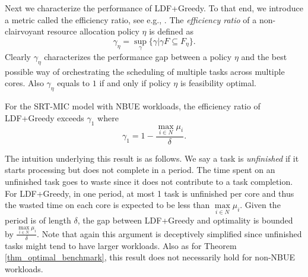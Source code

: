\documentclass[prodmode,acmtompecs]{acmsmall}
\newcommand{\feasibilityRegion}{F}
\newcommand{\fullUserSet}{N}
\newcommand{\myComments}[1]{}
\newif\ifinfocom
\newif\iftompecs
\newif\ifdissertation
\newcommand{\infocomStart}{\ifinfocom \myComments{Infocom: }}
\newcommand{\tompecsStart}{\iftompecs \myComments{TOMPECS version: }}
\newcommand{\dissertationStart}{\ifdissertation  \myComments{Dissertation version: }}
\newcommand{\commentEnd}{\myComments{End}}
\begin{document}
Next we characterize the performance of LDF+Greedy. To that end, we introduce a metric called the efficiency ratio, see e.g., \cite{JLS07A}. The {\em efficiency ratio} of a non-clairvoyant resource allocation policy $\eta$ is defined as 
$$
\gamma_\eta = \sup\limits_{\gamma}\{\gamma | \gamma \feasibilityRegion \subseteq \feasibilityRegion_\eta \}. 
$$
Clearly $\gamma_\eta$ characterizes the performance gap between a policy $\eta$ and the best possible way of orchestrating the scheduling of multiple tasks across multiple cores. Also $\gamma_\eta$ equals to $1$ if and only if policy $\eta$ is feasibility optimal. 

\begin{theorem}
\label{thm_LDF_greedy_eff_ratio}
For the SRT-MIC model with NBUE workloads, the efficiency ratio of LDF+Greedy exceeds $\gamma_1$ where
$$
\gamma_1 = 1 - \frac{\max\limits_{i \in \fullUserSet} \mu_i}{\delta}. 
$$
\end{theorem}

The intuition underlying this result is as follows. 
We say a task is {\em unfinished} if it starts processing but does not complete in a period.
The time spent on an unfinished task goes to waste since it does not contribute to a task completion. 
For LDF+Greedy, in one period, at most 1 task is unfinished per core and thus the wasted time on each core is expected to be less than $\max\limits_{i\in \fullUserSet} \mu_i$. Given the period is of length $\delta$, the gap between LDF+Greedy and optimality is bounded by $\frac{\max\limits_{i \in \fullUserSet} \mu_i}{\delta}$. 
Note that again this argument is deceptively simplified since unfinished tasks might tend to have larger workloads. 
Also as for Theorem \ref{thm_optimal_benchmark}, this result does not necessarily hold for non-NBUE workloads. 
\infocomStart
A sketch of the proof of this result using Theorem \ref{thm_R_IB} is included in Appendix \ref{appendix_pf_gamma_LDF_Greedy} and detailed proof is provided in the extended version of this paper \cite{EXT}. 
\commentEnd\fi
\tompecsStart
The formal proof is given below. 
\commentEnd\fi

\dissertationStart
We first provide an intuitive way to understand this theorem. 
We say a task is {\em unfinished} if it starts processing but does not complete in a period.
If a task is unfinished the time spent on the task goes to waste since it does not contribute to a task completion. 
For LDF+Greedy, in one period, since at most 1 task is unfinished per core, the wasted time on each core is expected to be less than $\max\limits_{i\in \fullUserSet} \mu_i$. Given the period length $\delta$, the gap between LDF+Greedy and optimality is bounded by $\frac{\max\limits_{i \in \fullUserSet} \mu_i}{\delta}$. 
Note that again this argument is deceptive since unfinished tasks might tend to have larger workloads. 
As for Theorem \ref{thm_optimal_benchmark}, this result does not necessarily hold for non-NBUE workloads. 
\commentEnd\fi
\end{document}

